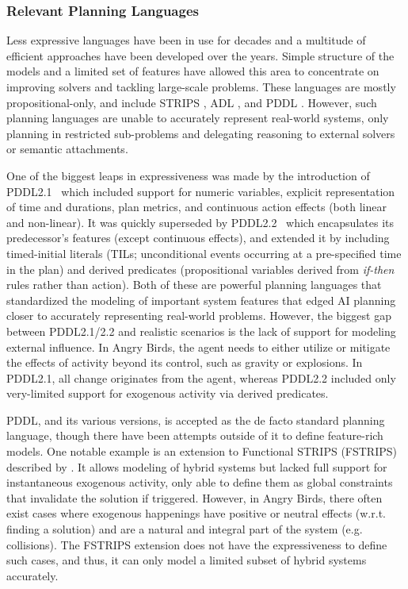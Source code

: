\subsubsection{Relevant Planning Languages}

Less expressive languages have been in use for decades and a multitude of efficient approaches have been developed over the years. Simple structure of the models and a limited set of features have allowed this area to concentrate on improving solvers and tackling large-scale problems. These languages are mostly propositional-only, and include STRIPS \cite{fikes1971strips}, ADL \cite{pednault1987formulating}, and PDDL \cite{mcdermott1998pddl}. However, such planning languages are unable to accurately represent real-world systems, only planning in restricted sub-problems and delegating reasoning to external solvers or semantic attachments.

One of the biggest leaps in expressiveness was made by the introduction of PDDL2.1~\cite{fox2003pddl2} which included support for numeric variables, explicit representation of time and durations, plan metrics, and continuous action effects (both linear and non-linear). It was quickly superseded by PDDL2.2~\cite{edelkamp2004pddl2} which encapsulates its predecessor's features (except continuous effects), and extended it by including timed-initial literals (TILs; unconditional events occurring at a pre-specified time in the plan) and derived predicates (propositional variables derived from \textit{if-then} rules rather than action). Both of these are powerful planning languages that standardized the modeling of important system features that edged AI planning closer to accurately representing real-world problems. However, the biggest gap between PDDL2.1/2.2 and realistic scenarios is the lack of support for modeling external influence. In Angry Birds, the agent needs to either utilize or mitigate the effects of activity beyond its control, such as gravity or explosions. In PDDL2.1, all change originates from the agent, whereas PDDL2.2 included only very-limited support for exogenous activity via derived predicates. 

PDDL, and its various versions, is accepted as the de facto standard planning language, though there have been attempts outside of it to define feature-rich models. One notable example is an extension to Functional STRIPS (FSTRIPS) described by \cite{ramirez2017numerical}. It allows modeling of hybrid systems but lacked full support for instantaneous exogenous activity, only able to define them as global constraints that invalidate the solution if triggered. However, in Angry Birds, there often exist cases where exogenous happenings have positive or neutral effects (w.r.t. finding a solution) and are a natural and integral part of the system (e.g. collisions). The FSTRIPS extension does not have the expressiveness to define such cases, and thus, it can only model a limited subset of hybrid systems accurately. 

